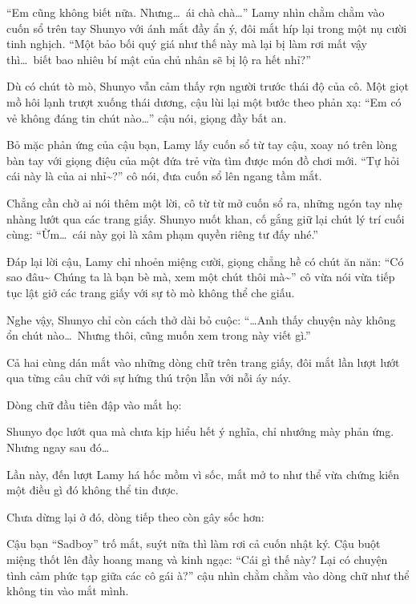 \documentclass[../main.tex]{subfiles}
\begin{document}
``Em cũng không biết nữa. Nhưng\dots\ ái chà chà\dots'' Lamy nhìn chằm chằm vào cuốn sổ trên tay Shunyo với ánh mắt đầy ẩn ý, đôi mắt híp lại trong một nụ cười tinh nghịch. ``Một bảo bối quý giá như thế này mà lại bị làm rơi mất vậy thì\dots\ biết bao nhiêu bí mật của chủ nhân sẽ bị lộ ra hết nhỉ?''

Dù có chút tò mò, Shunyo vẫn cảm thấy rợn người trước thái độ của cô. Một giọt mồ hôi lạnh trượt xuống thái dương, cậu lùi lại một bước theo phản xạ: ``Em có vẻ không đáng tin chút nào\dots'' cậu nói, giọng đầy bất an.

Bỏ mặc phản ứng của cậu bạn, Lamy lấy cuốn sổ từ tay cậu, xoay nó trên lòng bàn tay với giọng điệu của một đứa trẻ vừa tìm được món đồ chơi mới. ``Tự hỏi cái này là của ai nhỉ\~{}?'' cô nói, đưa cuốn sổ lên ngang tầm mắt.

Chẳng cần chờ ai nói thêm một lời, cô từ từ mở cuốn sổ ra, những ngón tay nhẹ nhàng lướt qua các trang giấy. Shunyo nuốt khan, cố gắng giữ lại chút lý trí cuối cùng: ``Ừm\dots\ cái này gọi là xâm phạm quyền riêng tư đấy nhé.''

Đáp lại lời cậu, Lamy chỉ nhoẻn miệng cười, giọng chẳng hề có chút ăn năn: ``Có sao đâu\~{} Chúng ta là bạn bè mà, xem một chút thôi mà\~{}'' cô vừa nói vừa tiếp tục lật giở các trang giấy với sự tò mò không thể che giấu.

Nghe vậy, Shunyo chỉ còn cách thở dài bỏ cuộc: ``\dots Anh thấy chuyện này không ổn chút nào\dots\ Nhưng thôi, cũng muốn xem trong này viết gì.''

Cả hai cùng dán mắt vào những dòng chữ trên trang giấy, đôi mắt lần lượt lướt qua từng câu chữ với sự hứng thú trộn lẫn với nỗi áy náy.

Dòng chữ đầu tiên đập vào mắt họ:


Shunyo đọc lướt qua mà chưa kịp hiểu hết ý nghĩa, chỉ nhướng mày phản ứng. Nhưng ngay sau đó\dots


Lần này, đến lượt Lamy há hốc mồm vì sốc, mắt mở to như thể vừa chứng kiến một điều gì đó không thể tin được.

Chưa dừng lại ở đó, dòng tiếp theo còn gây sốc hơn:


Cậu bạn ``Sadboy'' trố mắt, suýt nữa thì làm rơi cả cuốn nhật ký. Cậu buột miệng thốt lên đầy hoang mang và kinh ngạc: ``Cái gì thế này? Lại có chuyện tình cảm phức tạp giữa các cô gái à?'' cậu nhìn chằm chằm vào dòng chữ như thể không tin vào mắt mình.
\end{document}
